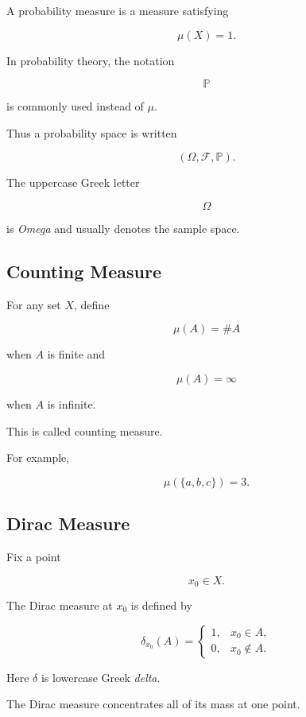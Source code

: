 A probability measure is a measure satisfying

\[
\boxed{
\mu(X)=1.
}
\]

In probability theory, the notation

\[
\mathbb{P}
\]

is commonly used instead of \(\mu\).

Thus a probability space is written

\[
\boxed{
(\Omega,\mathcal{F},\mathbb{P}).
}
\]

The uppercase Greek letter

\[
\Omega
\]

is \emph{Omega} and usually denotes the sample space.

\subsection{Counting Measure}
\label{subsec:counting-measure}

For any set \(X\), define

\[
\boxed{
\mu(A)
=
\#A
}
\]

when \(A\) is finite and

\[
\mu(A)=\infty
\]

when \(A\) is infinite.

This is called counting measure.

For example,

\[
\mu(\{a,b,c\})=3.
\]

\subsection{Dirac Measure}
\label{subsec:dirac-measure}

Fix a point

\[
x_0\in X.
\]

The Dirac measure at \(x_0\) is defined by

\[
\boxed{
\delta_{x_0}(A)
=
\begin{cases}
1, & x_0\in A,\\
0, & x_0\notin A.
\end{cases}
}
\]

Here \(\delta\) is lowercase Greek \emph{delta}.

The Dirac measure concentrates all of its mass at one point.

